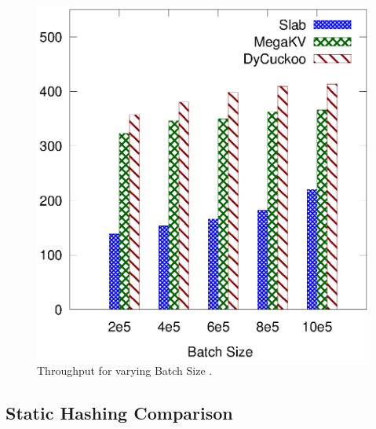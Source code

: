\begin{figure}[htp]
\begin{minipage}{0.19\linewidth}
		\centerline{\dsali}
	\end{minipage}
	\begin{minipage}{0.19\linewidth}\centering
		\includegraphics[width=\linewidth]{pic/dynamic/batch/dynamic_random.eps}
		\centerline{\dsrandom}
	\end{minipage}
	\caption{Throughput for varying Batch Size .}
	\label{fig:vary-batch-size}
\end{figure}

\subsection{Static Hashing Comparison}\label{sec:exp:static}

